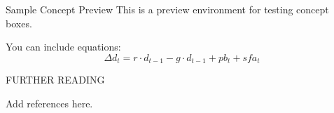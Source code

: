 \documentclass[12pt, colorlinks, boxes]{bp-book}
\begin{document}
% 

\begin{boxconcept}{Sample Concept Preview}
    This is a preview environment for testing concept boxes.

    You can include equations:
    \[
        \Delta d_t = r \cdot d_{t-1} - g \cdot d_{t-1} + pb_t + sfa_t
    \]

    \tcblower
    FURTHER READING

    Add references here.
\end{boxconcept}
\end{document}
